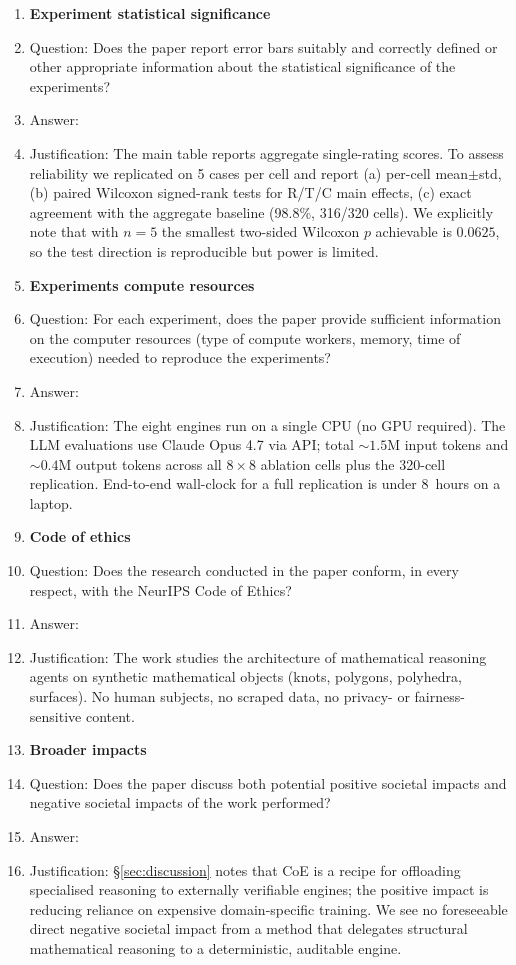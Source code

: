 \begin{enumerate}
\item {\bf Experiment statistical significance}
    \item[] Question: Does the paper report error bars suitably and correctly defined or other appropriate information about the statistical significance of the experiments?
    \item[] Answer: \answerYes{}
    \item[] Justification: The main table reports aggregate single-rating scores. To assess reliability we replicated on 5 cases per cell and report (a) per-cell mean$\pm$std, (b) paired Wilcoxon signed-rank tests for R/T/C main effects, (c) exact agreement with the aggregate baseline (98.8\%, 316/320 cells). We explicitly note that with $n{=}5$ the smallest two-sided Wilcoxon $p$ achievable is $0.0625$, so the test direction is reproducible but power is limited.

\item {\bf Experiments compute resources}
    \item[] Question: For each experiment, does the paper provide sufficient information on the computer resources (type of compute workers, memory, time of execution) needed to reproduce the experiments?
    \item[] Answer: \answerYes{}
    \item[] Justification: The eight engines run on a single CPU (no GPU required). The LLM evaluations use Claude Opus 4.7 via API; total $\sim 1.5$M input tokens and $\sim 0.4$M output tokens across all $8 \times 8$ ablation cells plus the 320-cell replication. End-to-end wall-clock for a full replication is under 8~hours on a laptop.

\item {\bf Code of ethics}
    \item[] Question: Does the research conducted in the paper conform, in every respect, with the NeurIPS Code of Ethics?
    \item[] Answer: \answerYes{}
    \item[] Justification: The work studies the architecture of mathematical reasoning agents on synthetic mathematical objects (knots, polygons, polyhedra, surfaces). No human subjects, no scraped data, no privacy- or fairness-sensitive content.

\item {\bf Broader impacts}
    \item[] Question: Does the paper discuss both potential positive societal impacts and negative societal impacts of the work performed?
    \item[] Answer: \answerYes{}
    \item[] Justification: \S\ref{sec:discussion} notes that CoE is a recipe for offloading specialised reasoning to externally verifiable engines; the positive impact is reducing reliance on expensive domain-specific training. We see no foreseeable direct negative societal impact from a method that delegates structural mathematical reasoning to a deterministic, auditable engine.


\end{enumerate}

